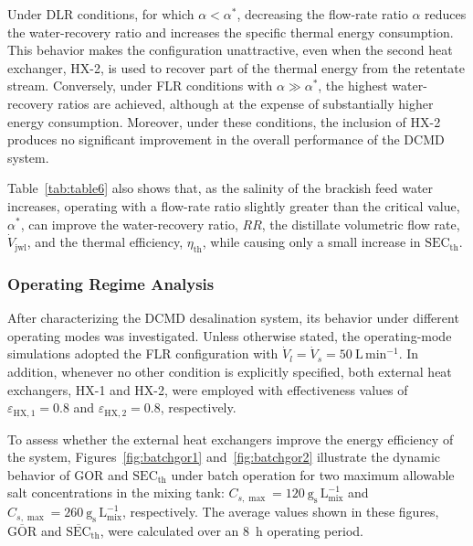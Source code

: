 \documentclass[14pt,letterpaper,fleqn]{extarticle}
\begin{document}
Under DLR conditions, for which $\alpha < \alpha^{*}$, decreasing the flow-rate ratio $\alpha$ reduces the water-recovery
ratio and increases the specific thermal energy consumption. This behavior makes the configuration unattractive,
even when the second heat exchanger, HX-2, is used to recover part of the thermal energy from the retentate stream. 
Conversely, under FLR conditions with $\alpha \gg \alpha^{*}$, the highest water-recovery ratios are achieved, 
although at the expense of substantially higher energy consumption. Moreover, under these conditions, the inclusion
of HX-2 produces no significant improvement in the overall performance of the DCMD system.

Table~\ref{tab:table6} also shows that, as the salinity of the brackish feed water increases, operating with a 
flow-rate ratio slightly greater than the critical value, $\alpha^{*}$, can improve the water-recovery ratio,
$RR$, the distillate volumetric flow rate, $\dot{V}_{\mathrm{jwl}}$, and the thermal efficiency, $\eta_{\mathrm{th}}$, 
while causing only a small increase in $\mathrm{SEC}_{\mathrm{th}}$.

\subsubsection{Operating Regime Analysis}

After characterizing the DCMD desalination system, its behavior under different
operating modes was investigated. Unless otherwise stated, the operating-mode
simulations adopted the FLR configuration with
$\dot{V}_{l}=\dot{V}_{s}=50~\mathrm{L\,min^{-1}}$. In addition, whenever no
other condition is explicitly specified, both external heat exchangers, HX-1
and HX-2, were employed with effectiveness values of
$\varepsilon_{\mathrm{HX},1}=0.8$ and
$\varepsilon_{\mathrm{HX},2}=0.8$, respectively.

To assess whether the external heat exchangers improve the energy efficiency of
the system, Figures~\ref{fig:batchgor1} and~\ref{fig:batchgor2} illustrate the
dynamic behavior of $\mathrm{GOR}$ and $\mathrm{SEC}_{\mathrm{th}}$ under batch
operation for two maximum allowable salt concentrations in the mixing tank:
$C_{s,\max}=120~\mathrm{g_s\,L_{mix}^{-1}}$ and
$C_{s,\max}=260~\mathrm{g_s\,L_{mix}^{-1}}$, respectively. The average values
shown in these figures, $\overline{\mathrm{GOR}}$ and
$\overline{\mathrm{SEC}}_{\mathrm{th}}$, were calculated over an 8~h operating
period.
\end{document}
